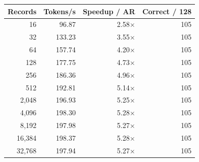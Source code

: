 \begin{tabular}{rrrr}
\toprule
Records & Tokens/s & Speedup / AR & Correct / 128 \\
\midrule
16 & 96.87 & 2.58$\times$ & 105 \\
32 & 133.23 & 3.55$\times$ & 105 \\
64 & 157.74 & 4.20$\times$ & 105 \\
128 & 177.75 & 4.73$\times$ & 105 \\
256 & 186.36 & 4.96$\times$ & 105 \\
512 & 192.81 & 5.14$\times$ & 105 \\
2,048 & 196.93 & 5.25$\times$ & 105 \\
4,096 & 198.30 & 5.28$\times$ & 105 \\
8,192 & 197.98 & 5.27$\times$ & 105 \\
16,384 & 198.37 & 5.28$\times$ & 105 \\
32,768 & 197.94 & 5.27$\times$ & 105 \\
\bottomrule
\end{tabular}
